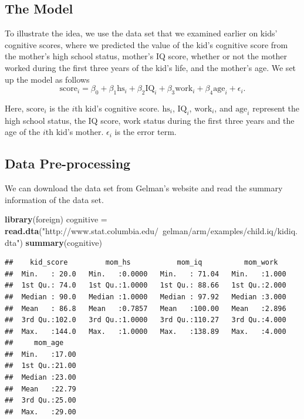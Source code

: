 \documentclass[]{book}
\newenvironment{Shaded}{\begin{snugshade}}{\end{snugshade}}
\newcommand{\KeywordTok}[1]{\textcolor[rgb]{0.13,0.29,0.53}{\textbf{#1}}}
\newcommand{\StringTok}[1]{\textcolor[rgb]{0.31,0.60,0.02}{#1}}
\newcommand{\NormalTok}[1]{#1}
\theoremstyle{definition}
\theoremstyle{definition}
\theoremstyle{definition}
\theoremstyle{remark}
\begin{document}
\subsection{The Model}\label{the-model}

To illustrate the idea, we use the data set that we examined earlier on
kids' cognitive scores, where we predicted the value of the kid's
cognitive score from the mother's high school status, mother's IQ score,
whether or not the mother worked during the first three years of the
kid's life, and the mother's age. We set up the model as follows
\[ \text{score}_i = \beta_0 + \beta_1 \text{hs}_i + \beta_2\text{IQ}_i + \beta_3\text{work}_i + \beta_4 \text{age}_i + \epsilon_i. \]

Here, \(\text{score}_i\) is the \(i\)th kid's cognitive score.
\(\text{hs}_i\), \(\text{IQ}_i\), \(\text{work}_i\), and
\(\text{age}_i\) represent the high school status, the IQ score, work
status during the first three years and the age of the \(i\)th kid's
mother. \(\epsilon_i\) is the error term.

\subsection{Data Pre-processing}\label{data-pre-processing}

We can download the data set from Gelman's website and read the summary
information of the data set.

\begin{Shaded}
\begin{Highlighting}[]
\KeywordTok{library}\NormalTok{(foreign)}
\NormalTok{cognitive =}\StringTok{ }\KeywordTok{read.dta}\NormalTok{(}\StringTok{"http://www.stat.columbia.edu/~gelman/arm/examples/child.iq/kidiq.dta"}\NormalTok{)}
\KeywordTok{summary}\NormalTok{(cognitive)}
\end{Highlighting}
\end{Shaded}

\begin{verbatim}
##    kid_score         mom_hs           mom_iq          mom_work    
##  Min.   : 20.0   Min.   :0.0000   Min.   : 71.04   Min.   :1.000  
##  1st Qu.: 74.0   1st Qu.:1.0000   1st Qu.: 88.66   1st Qu.:2.000  
##  Median : 90.0   Median :1.0000   Median : 97.92   Median :3.000  
##  Mean   : 86.8   Mean   :0.7857   Mean   :100.00   Mean   :2.896  
##  3rd Qu.:102.0   3rd Qu.:1.0000   3rd Qu.:110.27   3rd Qu.:4.000  
##  Max.   :144.0   Max.   :1.0000   Max.   :138.89   Max.   :4.000  
##     mom_age     
##  Min.   :17.00  
##  1st Qu.:21.00  
##  Median :23.00  
##  Mean   :22.79  
##  3rd Qu.:25.00  
##  Max.   :29.00
\end{verbatim}
\end{document}
